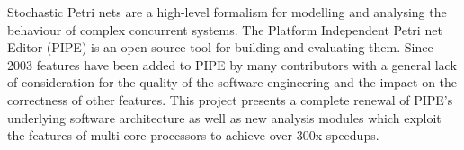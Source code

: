 Stochastic Petri nets are a high-level formalism for modelling and analysing the behaviour of complex concurrent systems.
The Platform Independent Petri net Editor (PIPE) is an open-source tool for building and evaluating them. Since 2003 features have been added to PIPE by many contributors with a general lack of consideration for the quality of the software engineering and the impact on the correctness of other features. This project presents a complete renewal of PIPE's underlying software architecture as well as new analysis modules which exploit the features of multi-core processors to achieve over 300x speedups. 